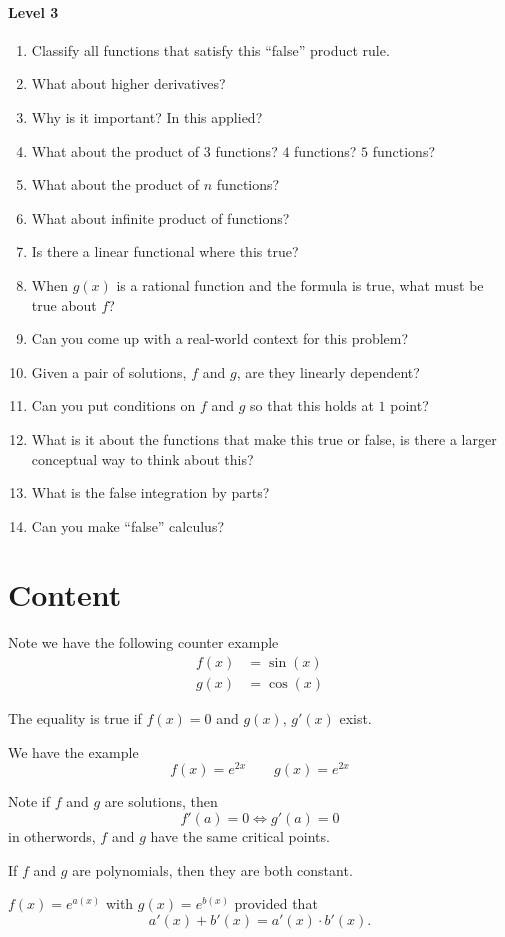 \documentclass{ximera}
\begin{document}
\paragraph{Level 3}
\begin{enumerate}
\item Classify all functions that satisfy this ``false'' product rule.
\item What about higher derivatives?
\item Why is it important? In this applied?
\item What about the product of $3$ functions? $4$ functions? $5$ functions? 
\item What about the product of $n$ functions?
\item What about infinite product of functions?
\item Is there a linear functional where this true?

\item When $g(x)$ is a rational function and the formula is true, what
  must be true about $f$?
\item Can you come up with a real-world context for this problem?
\item Given a pair of solutions, $f$ and $g$, are they linearly dependent?
\item Can you put conditions on $f$ and $g$ so that this holds at $1$ point?
\item What is it about the functions that make this true or false, is
  there a larger conceptual way to think about this?
\item What is the false integration by parts?
\item Can you make ``false'' calculus?
\end{enumerate}


\section{Content}

Note we have the following counter example
\begin{align*}
  f(x) &= \sin(x)\\
  g(x) &= \cos(x)
\end{align*}

The equality is true if $f(x) = 0$ and $g(x)$, $g'(x)$ exist.

We have the example
\[
f(x) = e^{2x} \qquad g(x) = e^{2x}
\]

Note if $f$ and $g$ are solutions, then
\[
f'(a) = 0 \Leftrightarrow g'(a) = 0
\]
in otherwords, $f$ and $g$ have the same critical points.


If $f$ and $g$ are polynomials, then they are both constant. 


$f(x) = e^{a(x)}$ with $g(x) = e^{b(x)}$ provided that
\[
a'(x)+b'(x) = a'(x)\cdot b'(x).
\]
\end{document}
